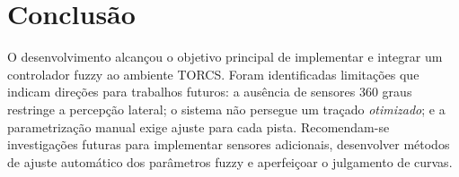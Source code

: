 \documentclass[12pt]{article}
\begin{document}
\section{Conclus\~ao}
O desenvolvimento alcan\c{c}ou o objetivo principal de implementar e integrar um controlador fuzzy ao ambiente TORCS. Foram identificadas limita\c{c}\~oes que indicam dire\c{c}\~oes para trabalhos futuros: a aus\^encia de sensores 360 graus restringe a percep\c{c}\~ao lateral; o sistema n\~ao persegue um tra\c{c}ado \emph{otimizado}; e a parametriza\c{c}\~ao manual exige ajuste para cada pista. Recomendam-se investiga\c{c}\~oes futuras para implementar sensores adicionais, desenvolver m\'etodos de ajuste autom\'atico dos par\^ametros fuzzy e aperfei\c{c}oar o julgamento de curvas.



\end{document}
